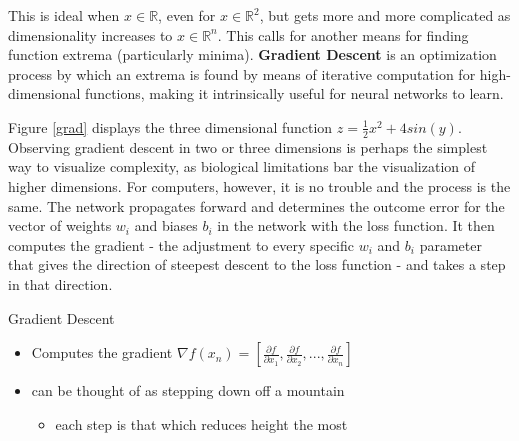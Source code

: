 This is ideal when \(x \in \mathbb{R}\), even for
\(x \in \mathbb{R}^2\), but gets more  and more complicated as
dimensionality increases to \(x \in \mathbb{R}^n\). This calls for
another means for finding function extrema (particularly minima).
\textbf{Gradient Descent} is an optimization process by which an extrema is found by
means of iterative computation for high-dimensional functions, making it
intrinsically useful for neural networks to learn.

Figure \ref{grad} displays the three dimensional function $z = \frac{1}{2} x^2 + 4 sin(y)$.  Observing gradient descent in two or three dimensions is perhaps the simplest way to visualize complexity, as biological limitations bar the visualization of higher dimensions.  For computers, however, it is no trouble and the process is the same.  The network propagates forward and determines the outcome error for the vector of weights $w_i$ and biases $b_i$ in the network with the loss function.  It then computes the gradient - the adjustment to every specific $w_i$ and $b_i$ parameter that gives the direction of steepest descent to the loss function - and takes a step in that direction.

Gradient Descent

\begin{itemize}
\tightlist
\item
  Computes the gradient 
$  
  \nabla f(x_n) =
  \left[ \frac{\partial f}{\partial x_1} , \frac{\partial f}{\partial x_2} , ... , \frac{\partial f}{\partial x_n} \right]
$
  
\item
  can be thought of as stepping down off a mountain

  \begin{itemize}
  \tightlist
  \item
    each step is that which reduces height the most
  \end{itemize}
\end{itemize}




